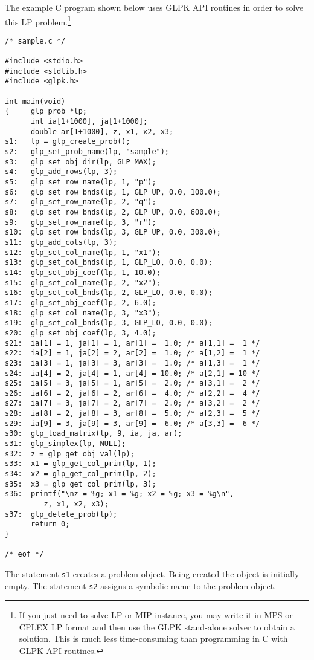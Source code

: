 The example C program shown below uses GLPK API routines in order to
solve this LP problem.\footnote{If you just need to solve LP or MIP
instance, you may write it in MPS or CPLEX LP format and then use the
GLPK stand-alone solver to obtain a solution. This is much less
time-consuming than programming in C with GLPK API routines.}

\newpage

\begin{verbatim}
/* sample.c */

#include <stdio.h>
#include <stdlib.h>
#include <glpk.h>

int main(void)
{     glp_prob *lp;
      int ia[1+1000], ja[1+1000];
      double ar[1+1000], z, x1, x2, x3;
s1:   lp = glp_create_prob();
s2:   glp_set_prob_name(lp, "sample");
s3:   glp_set_obj_dir(lp, GLP_MAX);
s4:   glp_add_rows(lp, 3);
s5:   glp_set_row_name(lp, 1, "p");
s6:   glp_set_row_bnds(lp, 1, GLP_UP, 0.0, 100.0);
s7:   glp_set_row_name(lp, 2, "q");
s8:   glp_set_row_bnds(lp, 2, GLP_UP, 0.0, 600.0);
s9:   glp_set_row_name(lp, 3, "r");
s10:  glp_set_row_bnds(lp, 3, GLP_UP, 0.0, 300.0);
s11:  glp_add_cols(lp, 3);
s12:  glp_set_col_name(lp, 1, "x1");
s13:  glp_set_col_bnds(lp, 1, GLP_LO, 0.0, 0.0);
s14:  glp_set_obj_coef(lp, 1, 10.0);
s15:  glp_set_col_name(lp, 2, "x2");
s16:  glp_set_col_bnds(lp, 2, GLP_LO, 0.0, 0.0);
s17:  glp_set_obj_coef(lp, 2, 6.0);
s18:  glp_set_col_name(lp, 3, "x3");
s19:  glp_set_col_bnds(lp, 3, GLP_LO, 0.0, 0.0);
s20:  glp_set_obj_coef(lp, 3, 4.0);
s21:  ia[1] = 1, ja[1] = 1, ar[1] =  1.0; /* a[1,1] =  1 */
s22:  ia[2] = 1, ja[2] = 2, ar[2] =  1.0; /* a[1,2] =  1 */
s23:  ia[3] = 1, ja[3] = 3, ar[3] =  1.0; /* a[1,3] =  1 */
s24:  ia[4] = 2, ja[4] = 1, ar[4] = 10.0; /* a[2,1] = 10 */
s25:  ia[5] = 3, ja[5] = 1, ar[5] =  2.0; /* a[3,1] =  2 */
s26:  ia[6] = 2, ja[6] = 2, ar[6] =  4.0; /* a[2,2] =  4 */
s27:  ia[7] = 3, ja[7] = 2, ar[7] =  2.0; /* a[3,2] =  2 */
s28:  ia[8] = 2, ja[8] = 3, ar[8] =  5.0; /* a[2,3] =  5 */
s29:  ia[9] = 3, ja[9] = 3, ar[9] =  6.0; /* a[3,3] =  6 */
s30:  glp_load_matrix(lp, 9, ia, ja, ar);
s31:  glp_simplex(lp, NULL);
s32:  z = glp_get_obj_val(lp);
s33:  x1 = glp_get_col_prim(lp, 1);
s34:  x2 = glp_get_col_prim(lp, 2);
s35:  x3 = glp_get_col_prim(lp, 3);
s36:  printf("\nz = %g; x1 = %g; x2 = %g; x3 = %g\n",
         z, x1, x2, x3);
s37:  glp_delete_prob(lp);
      return 0;
}

/* eof */
\end{verbatim}

The statement \verb|s1| creates a problem object. Being created the
object is initially empty. The statement \verb|s2| assigns a symbolic
name to the problem object.

